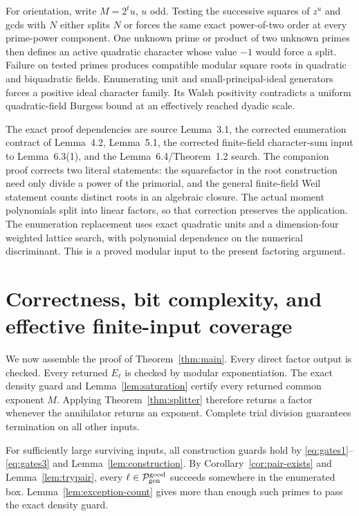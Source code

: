For orientation, write \(M=2^tu\), \(u\) odd.  Testing the successive
squares of \(z^u\) and gcds with \(N\) either splits \(N\) or
forces the same exact power-of-two order at every prime-power
component.  One unknown prime or product of two unknown primes
then defines an active quadratic character whose value \(-1\)
would force a split.  Failure on tested primes produces compatible
modular square roots in quadratic and biquadratic fields.  Enumerating
unit and small-principal-ideal generators forces a positive ideal
character family.  Its Walsh positivity contradicts a uniform
quadratic-field Burgess bound at an effectively reached dyadic scale.

The exact proof dependencies are source Lemma~3.1, the corrected
enumeration contract of Lemma~4.2, Lemma~5.1, the corrected
finite-field character-sum input to Lemma~6.3(1), and the
Lemma~6.4/Theorem~1.2 search.  The companion proof corrects two
literal statements: the squarefactor in the root construction need
only divide a power of the primorial, and the general finite-field
Weil statement counts distinct roots in an algebraic closure.
The actual moment polynomials split into linear factors, so that
correction preserves the application.  The enumeration replacement
uses exact quadratic units and a dimension-four weighted lattice
search, with polynomial dependence on the numerical discriminant.
This is a proved modular input to the present factoring argument.

\section{Correctness, bit complexity, and effective finite-input coverage}
\label{sec:runtime}

We now assemble the proof of Theorem~\ref{thm:main}.
Every direct factor output is checked.  Every returned \(E_\ell\)
is checked by modular exponentiation.  The exact density guard and
Lemma~\ref{lem:saturation} certify every returned common exponent
\(M\).  Applying Theorem~\ref{thm:splitter} therefore returns a
factor whenever the annihilator returns an exponent.  Complete
trial division guarantees termination on all other inputs.

For sufficiently large surviving inputs, all construction guards
hold by \eqref{eq:gates1}--\eqref{eq:gates3} and
Lemma~\ref{lem:construction}.  By
Corollary~\ref{cor:pair-exists} and Lemma~\ref{lem:trypair}, every
\(\ell\in\mathcal P_{\rm gen}^{\rm good}\) succeeds somewhere in
the enumerated box.  Lemma~\ref{lem:exception-count} gives more
than enough such primes to pass the exact density guard.

